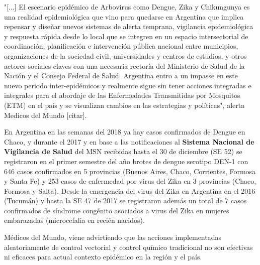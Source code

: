 "[...] El escenario epidémico de Arbovirus como Dengue, Zika y Chikungunya es una
realidad epidemiológica que vino para quedarse en Argentina que implica repensar
y diseñar nuevos sistemas de alerta temprana, vigilancia epidemiológica y
respuesta rápida desde lo local que se integren en un espacio intersectorial de
coordinación, planificación e intervención pública nacional entre municipios,
organizaciones de la sociedad civil, universidades y centros de estudios, y
otros actores sociales claves con una necesaria rectoría del
Ministerio de Salud de la Nación y el Consejo Federal de Salud.
Argentina entro a un impasse en este nuevo periodo inter-epidémicos y realmente
sigue sin tener acciones integradas e integrales para el abordaje de las
Enfermedades Transmitidas por Mosquitos (ETM) en el país y se visualizan
cambios en las estrategias y políticas", alerta Medicos del Mundo [citar].



En Argentina en las semanas del 2018 ya hay casos confirmados de Dengue en Chaco,
y durante el 2017 y en base a las notificaciones al
\textbf{Sistema Nacional de Vigilancia de Salud} del MSN recibidas hasta el
30 de diciembre (SE 52) se registraron en el primer semestre del año brotes de
dengue serotipo DEN-1 con 646 casos confirmados en 5 provincias
(Buenos Aires, Chaco, Corrientes, Formosa y Santa Fe) y 253 casos de enfermedad
por virus del Zika en 3 provincias (Chaco, Formosa y Salta).
Desde la emergencia del virus del Zika en Argentina en el 2016 (Tucumán) y hasta
la SE 47 de 2017 se registraron además un total de 7 casos confirmados de
síndrome congénito asociados a virus del Zika en mujeres embarazadas (microcefalia en recién nacidos).



Médicos del Mundo, viene advirtiendo que las acciones implementadas aleatoriamente
de control vectorial y control químico tradicional no son efectivas ni eficaces
para actual contexto epidémico en la región y el país.




